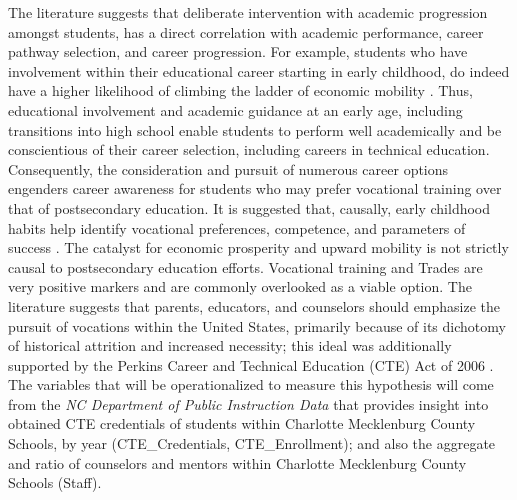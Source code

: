 The literature suggests that deliberate intervention with academic progression amongst students, has a direct correlation with academic performance, career pathway selection, and career progression. 
For example, students who have involvement within their educational career starting in early childhood, do indeed have a higher likelihood of climbing the ladder of economic mobility \parencite[][]{magnuson2000}.
Thus, educational involvement and academic guidance at an early age, including transitions into high school enable students to perform well academically and be conscientious of their career selection, including careers in technical education. 
Consequently, the consideration and pursuit of numerous career options engenders career awareness for students who may prefer vocational training over that of postsecondary education. 
It is suggested that, causally, early childhood habits help identify vocational preferences, competence, and parameters of success \parencite[][]{magnuson2000}.
The catalyst for economic prosperity and upward mobility is not strictly causal to postsecondary education efforts. 
Vocational training and Trades are very positive markers and are commonly overlooked as a viable option. 
The literature suggests that parents, educators, and counselors should emphasize the pursuit of vocations within the United States, primarily because of its dichotomy of historical attrition and increased necessity; this ideal was additionally supported by the Perkins Career and Technical Education (CTE) Act of 2006 \parencite[][]{castellano2017}.
The variables that will be operationalized to measure this hypothesis will come from the \textit{NC Department of Public Instruction Data} that provides insight into obtained CTE credentials of students within Charlotte Mecklenburg County Schools, by year (CTE\_Credentials, CTE\_Enrollment); and also the aggregate and ratio of counselors and mentors within Charlotte Mecklenburg County Schools (Staff).
